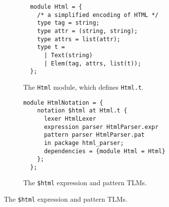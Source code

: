 \documentclass[acmsmall]{acmart}
\newcommand{\li}[1]{\lstinline[basicstyle=\ttfamily\fontsize{9pt}{1em}\selectfont]{#1}}
\begin{document}
\begin{figure}[t]
\begin{subfigure}[t]{0.46\textwidth}
\begin{lstlisting}
  module Html = {
    /* a simplified encoding of HTML */
    type tag = string;
    type attr = (string, string);
    type attrs = list(attr);
    type t = 
      | Text(string) 
      | Elem(tag, attrs, list(t));
  };
\end{lstlisting}
\vspace{-6px}
\caption{The \li{Html} module, which defines \li{Html.t}.}
\label{fig:html-type-def}
\end{subfigure}
\hfill
\begin{subfigure}[t]{0.52\textwidth}
\begin{lstlisting}[morekeywords={expression}]
  module HtmlNotation = {
    notation $html at Html.t {
      lexer HtmlLexer
      expression parser HtmlParser.expr
      pattern parser HtmlParser.pat 
      in package html_parser;
      dependencies = {module Html = Html}
    };
  };
\end{lstlisting}
\vspace{-6px}
\caption{The \li{$html} expression and pattern TLMs.}
\label{fig:html-tlm-def}
\end{subfigure}


\end{figure}
\end{document}
